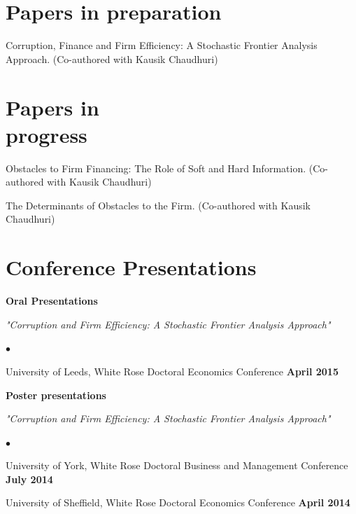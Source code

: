 \documentclass[margin,line,9pt]{res}
\newenvironment{list1}{
  \begin{list}{\ding{113}}{%
      \setlength{\itemsep}{0in}
      \setlength{\parsep}{0in} \setlength{\parskip}{0in}
      \setlength{\topsep}{0in} \setlength{\partopsep}{0in} 
      \setlength{\leftmargin}{0.17in}}}{\end{list}}
\newenvironment{list2}{
  \begin{list}{$\bullet$}{%
      \setlength{\itemsep}{0in}
      \setlength{\parsep}{0in} \setlength{\parskip}{0in}
      \setlength{\topsep}{0in} \setlength{\partopsep}{0in} 
      \setlength{\leftmargin}{0.2in}}}{\end{list}}
\begin{document}
\begin{resume}
\section{\sc Papers in preparation}

Corruption, Finance and Firm Efficiency: A Stochastic Frontier Analysis Approach. (Co-authored with Kausik Chaudhuri)

\section{\sc Papers in \\ progress}

Obstacles to Firm Financing: The Role of Soft and Hard Information. (Co-authored with Kausik Chaudhuri)

The Determinants of Obstacles to the Firm. (Co-authored with Kausik Chaudhuri)

\section{\sc Conference Presentations}
\textbf{Oral Presentations}
\vspace*{.05in} 
\begin{list1}
\item[] \textit{"Corruption and Firm Efficiency: A Stochastic Frontier Analysis Approach"}
\vspace*{.1in} 
\begin{list2}
\item University of Leeds, White Rose Doctoral Economics Conference \hfill \bf{April 2015}
\end{list2}
\end{list1}

\textbf{Poster presentations}
\vspace*{.05in} 
\begin{list1}
\item[] \textit{"Corruption and Firm Efficiency: A Stochastic Frontier Analysis Approach"}
\vspace*{.1in} 
\begin{list2}
\item University of York, White Rose Doctoral Business and Management Conference \hfill \textbf{July 2014}
\item University of Sheffield, White Rose Doctoral Economics Conference \hfill \textbf{April 2014}
\end{list2}
\end{list1}



\end{resume}
\end{document}
